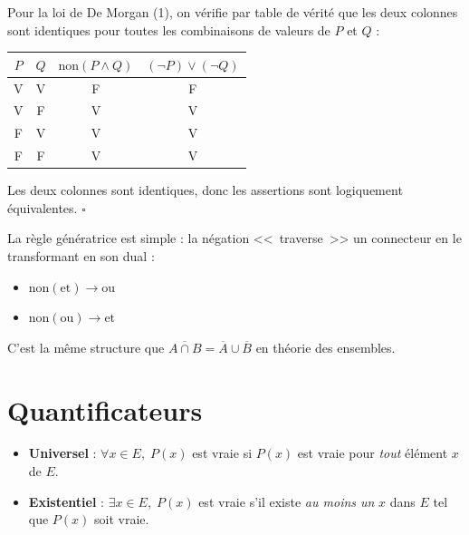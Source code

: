 \begin{proofbox}
Pour la loi de De Morgan (1), on vérifie par table de vérité que les deux colonnes sont identiques pour toutes les combinaisons de valeurs de $P$ et $Q$ :

\smallskip
\begin{center}
\begin{tabular}{cc|c|c}
$P$ & $Q$ & $\text{non}(P \wedge Q)$ & $(\neg P) \vee (\neg Q)$ \\
\hline
V & V & F & F \\
V & F & V & V \\
F & V & V & V \\
F & F & V & V \\
\end{tabular}
\end{center}
\smallskip

Les deux colonnes sont identiques, donc les assertions sont logiquement équivalentes. \hfill$\square$
\end{proofbox}

\begin{intuitionbox}
La règle génératrice est simple : la négation <<~traverse~>> un connecteur en le transformant en son dual :
\begin{itemize}[leftmargin=1cm]
  \item $\text{non}(\text{et}) \longrightarrow \text{ou}$
  \item $\text{non}(\text{ou}) \longrightarrow \text{et}$
\end{itemize}
C'est la même structure que $\overline{A \cap B} = \overline{A} \cup \overline{B}$ en théorie des ensembles.
\end{intuitionbox}


\section{Quantificateurs}

\begin{defbox}[--- Quantificateurs]
\begin{itemize}[leftmargin=1.5cm]
  \item \textbf{Universel} : $\forall x \in E,\; P(x)$ est vraie si $P(x)$ est vraie pour \emph{tout} élément $x$ de $E$.
  \item \textbf{Existentiel} : $\exists x \in E,\; P(x)$ est vraie s'il existe \emph{au moins un} $x$ dans $E$ tel que $P(x)$ soit vraie.
\end{itemize}
\end{defbox}

